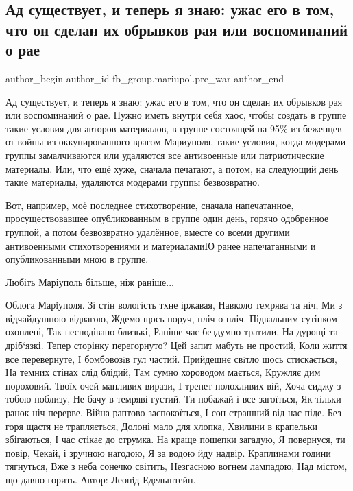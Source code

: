  
 
 
 
 

\subsection{Ад существует, и теперь я знаю: ужас его в том, что он сделан их обрывков рая или воспоминаний о рае}
\label{sec:04_03_2023.fb.fb_group.mariupol.pre_war.1.ad_sushchestvuet__i_}

\ifcmt
 author_begin
   author_id fb_group.mariupol.pre_war
 author_end
\fi

Ад существует, и теперь я знаю: ужас его в том, что он сделан их обрывков рая
или воспоминаний о рае. Нужно иметь внутри себя хаос, чтобы  создать в группе
такие условия для авторов материалов, в группе состоящей на 95\% из беженцев от
войны из оккупированного врагом  Мариуполя, такие условия, когда модерами
группы замалчиваются или удаляются все антивоенные или патриотические
материалы. Или, что ещё хуже, сначала печатают, а потом, на следующий день
такие материалы,  удаляются модерами группы  безвозвратно.

Вот, например, моё последнее стихотворение, сначала напечатанное,
просуществовавшее опубликованным в группе один день, горячо одобренное группой,
а потом безвозвратно удалённое, вместе со всеми другими антивоенными
стихотворениями и материаламиЮ ранее напечатанными и опубликованными мною в
группе.

Любіть Маріуполь більше, ніж раніше...

Облога Марiуполя.
Зі стін вологість тхне іржавая,
Навколо темрява та ніч,
Ми з відчайдушною відвагою,
Ждемо щось поруч, пліч-о-пліч.
Підвальним сутінком охоплені,
Так несподівано близькі,
Раніше час бездумно тратили,
На дурощі та дріб`язкі.
Тепер сторінку перегорнуто?
Цей запит мабуть не простий,
Коли життя все перевернуте,
І бомбовозiв гул частий.
Прийдешнє свiтло щось  стискається,
На темних стінах слід блідий,
Там сумно хороводом мається,
Кружляє дим пороховий.
Твоїх очей  манливих вирази,
I трепет полохливих вій,
Хоча сиджу з тобою поблизу,
Не бачу в темряві густий.
Ти побажай і все загоїться,
Як тільки ранок ніч перерве,
Війна раптово заспокоїться,
І сон страшний від нас піде.
Без горя щастя не трапляється,
Долоні мало для хлопка,
Хвилини в крапельки збігаються,
І час стікає до струмка.
На краще пошепки загадую,
Я повернуся, ти  повір,
Чекай, і зручною нагодою,
Я за водою йду надвір.
Краплинами години тягнуться,
Вже з неба сонечко світить,
Незгасною вогнем лампадою,
Над містом, що давно горить.
Автор: Леонiд Едельштейн.


